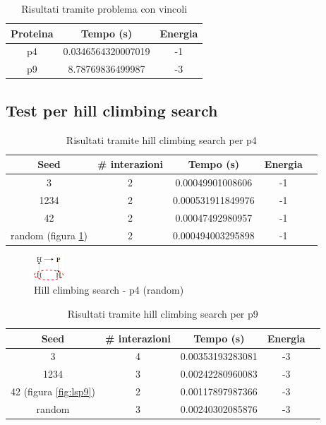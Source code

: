 \documentclass[conference]{IEEEtran}
\begin{document}
\begin{table}[H]
\begin{center}
\begin{tabular}{|c|c|c|}
\hline
\textbf{Proteina} & \textbf{Tempo (s)} & \textbf{Energia} \\ \hline
p4 & 0.0346564320007019 & -1 \\ \hline
p9 & 8.78769836499987 & -3 \\ \hline
\end{tabular}
\end{center}
\caption{Risultati tramite problema con vincoli}
\end{table}

\subsection{Test per hill climbing search}

\begin{table}[h]
\begin{center}
\begin{tabular}{|c|c|c|c|c|}
\hline
\textbf{Seed} & \textbf{\# interazioni} & \textbf{Tempo (s)} & \textbf{Energia} \\ \hline
3 & 2 & 0.00049901008606 & -1 \\ \hline
1234 & 2 & 0.000531911849976 & -1 \\ \hline
42 & 2 & 0.00047492980957 & -1 \\ \hline
random (figura \ref{fig:lsp4}) & 2 & 0.000494003295898 & -1 \\ \hline
\end{tabular}
\end{center}
\caption{Risultati tramite hill climbing search per p4}
\end{table}

\begin{figure}[H]
\centering
\includegraphics[width=0.10\textwidth]{figure/p4LS.png}
\caption{Hill climbing search - p4 (random)}
\label{fig:lsp4}
\end{figure}

\begin{table}[H]
\begin{center}
\begin{tabular}{|c|c|c|c|c|}
\hline
\textbf{Seed} & \textbf{\# interazioni} & \textbf{Tempo (s)} & \textbf{Energia} \\ \hline
3 & 4 & 0.00353193283081 & -3 \\ \hline
1234 & 3 & 0.00242280960083 & -3 \\ \hline
42 (figura \ref{fig:lsp9}) & 2 & 0.00117897987366 & -3 \\ \hline
random & 3 & 0.00240302085876 & -3 \\ \hline
\end{tabular}
\end{center}
\caption{Risultati tramite hill climbing search per p9}
\end{table}
\end{document}
